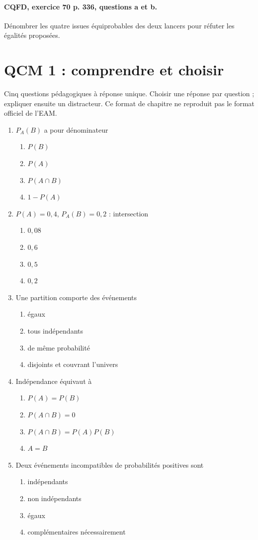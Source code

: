 \paragraph{CQFD, exercice 70 p. 336, questions a et b.}\label{C05-M2} Dénombrer les quatre issues équiprobables des deux lancers pour réfuter les égalités proposées.
\begingroup\small
\clearpage\section*{QCM 1 : comprendre et choisir}\label{C05-Q1}
Cinq questions pédagogiques à réponse unique. Choisir une réponse par question ; expliquer ensuite un distracteur. Ce format de chapitre ne reproduit pas le format officiel de l’EAM.
\begin{enumerate}
\item $P_A(B)$ a pour dénominateur
\begin{enumerate}[label=\Alph*.,itemsep=2pt]
\item $P(B)$
\item $P(A)$
\item $P(A\cap B)$
\item $1-P(A)$
\end{enumerate}
\item $P(A)=0{,}4$, $P_A(B)=0{,}2$ : intersection
\begin{enumerate}[label=\Alph*.,itemsep=2pt]
\item $0{,}08$
\item $0{,}6$
\item $0{,}5$
\item $0{,}2$
\end{enumerate}
\item Une partition comporte des événements
\begin{enumerate}[label=\Alph*.,itemsep=2pt]
\item égaux
\item tous indépendants
\item de même probabilité
\item disjoints et couvrant l’univers
\end{enumerate}
\item Indépendance équivaut à
\begin{enumerate}[label=\Alph*.,itemsep=2pt]
\item $P(A)=P(B)$
\item $P(A\cap B)=0$
\item $P(A\cap B)=P(A)P(B)$
\item $A=B$
\end{enumerate}
\item Deux événements incompatibles de probabilités positives sont
\begin{enumerate}[label=\Alph*.,itemsep=2pt]
\item indépendants
\item non indépendants
\item égaux
\item complémentaires nécessairement
\end{enumerate}
\end{enumerate}
